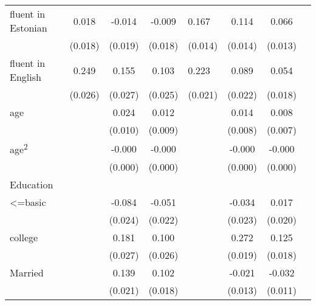 {\begin{longtable}{l*{3}{c}|l*{3}{c}}
		\midrule
		fluent in Estonian  &       0.018         &      -0.014         &      -0.009         &       0.167\sym{***}&       0.114\sym{***}&       0.066\sym{***}\\
		&     (0.018)         &     (0.019)         &     (0.018)         &     (0.014)         &     (0.014)         &     (0.013)         \\
		fluent in English   &       0.249\sym{***}&       0.155\sym{***}&       0.103\sym{***}&       0.223\sym{***}&       0.089\sym{***}&       0.054\sym{**} \\
		&     (0.026)         &     (0.027)         &     (0.025)         &     (0.021)         &     (0.022)         &     (0.018)         \\
		age                 &                     &       0.024\sym{*}  &       0.012         &                     &       0.014         &       0.008         \\
		&                     &     (0.010)         &     (0.009)         &                     &     (0.008)         &     (0.007)         \\
		age\textsuperscript{2}   &                     &      -0.000\sym{**} &      -0.000         &                     &      -0.000\sym{*}  &      -0.000         \\
		&                     &     (0.000)         &     (0.000)         &                     &     (0.000)         &     (0.000)         \\
		Education &&&&&\\
		<=basic             &                     &      -0.084\sym{***}&      -0.051\sym{*}  &                     &      -0.034         &       0.017         \\
		&                     &     (0.024)         &     (0.022)         &                     &     (0.023)         &     (0.020)         \\
		college             &                     &       0.181\sym{***}&       0.100\sym{***}&                     &       0.272\sym{***}&       0.125\sym{***}\\
		&                     &     (0.027)         &     (0.026)         &                     &     (0.019)         &     (0.018)         \\
		Married           &                     &       0.139\sym{***}&       0.102\sym{***}&                     &      -0.021         &      -0.032\sym{**} \\
		&                     &     (0.021)         &     (0.018)         &                     &     (0.013)         &     (0.011)         \\

\end{longtable}}

